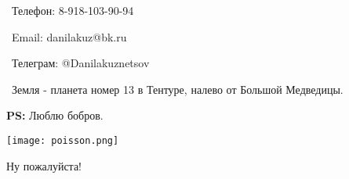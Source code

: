\documentclass[a4paper,12pt]{article}
\begin{document}
\faPhone \ Телефон: 8-918-103-90-94

\faAt \ Email: danilakuz@bk.ru

\faPaperPlaneO \ Телеграм: @Danila\textunderscore kuznetsov  

\faSpaceShuttle \ Земля - планета номер 13 в Тентуре, налево от Большой Медведицы.
\par\bigskip
\par\bigskip
\par\bigskip
\par\bigskip

	\textbf{\large PS:} Люблю бобров.

\par\bigskip
\par\bigskip
\par\bigskip
\par\bigskip
\par\bigskip
\par\bigskip
\par\bigskip
\par\bigskip

\texttt{[image: poisson.png]}

\LARGE \qquad \quad Ну пожалуйста! 
\end{document}
